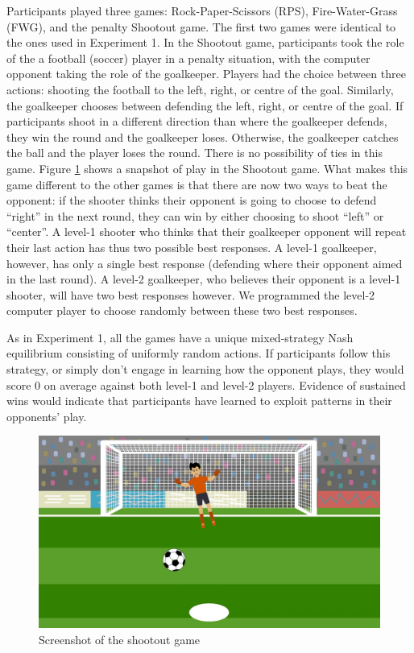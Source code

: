 \documentclass[smallextended]{svjour3}       %
\begin{document}
Participants played three games: Rock-Paper-Scissors (RPS),
Fire-Water-Grass (FWG), and the penalty Shootout game. The first two
games were identical to the ones used in Experiment 1. In the Shootout
game, participants took the role of the a football (soccer) player in a
penalty situation, with the computer opponent taking the role of the
goalkeeper. Players had the choice between three actions: shooting the
football to the left, right, or centre of the goal. Similarly, the
goalkeeper chooses between defending the left, right, or centre of the
goal. If participants shoot in a different direction than where the
goalkeeper defends, they win the round and the goalkeeper loses.
Otherwise, the goalkeeper catches the ball and the player loses the
round. There is no possibility of ties in this game. Figure
\ref{fig:screenshot-shootout} shows a snapshot of play in the Shootout
game. What makes this game different to the other games is that there
are now two ways to beat the opponent: if the shooter thinks their
opponent is going to choose to defend ``right'' in the next round, they
can win by either choosing to shoot ``left'' or ``center''. A level-1
shooter who thinks that their goalkeeper opponent will repeat their last
action has thus two possible best responses. A level-1 goalkeeper,
however, has only a single best response (defending where their opponent
aimed in the last round). A level-2 goalkeeper, who believes their
opponent is a level-1 shooter, will have two best responses however. We
programmed the level-2 computer player to choose randomly between these
two best responses.

As in Experiment 1, all the games have a unique mixed-strategy Nash
equilibrium consisting of uniformly random actions. If participants
follow this strategy, or simply don't engage in learning how the
opponent plays, they would score 0 on average against both level-1 and
level-2 players. Evidence of sustained wins would indicate that
participants have learned to exploit patterns in their opponents' play.

\begin{figure}

{\centering \includegraphics[width=\textwidth]{../images/shootout} 

}

\caption{Screenshot of the shootout game}\label{fig:screenshot-shootout}
\end{figure}
\end{document}
